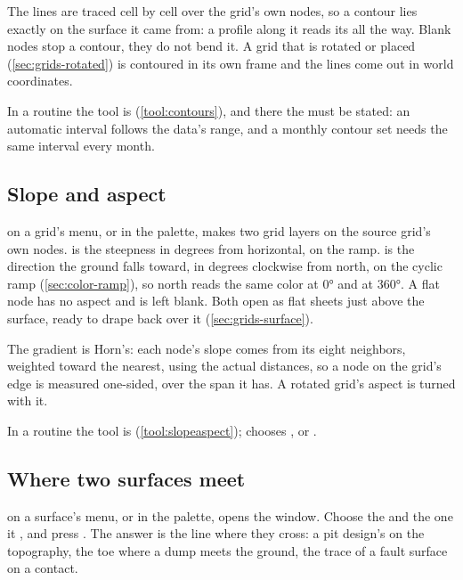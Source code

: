 The lines are traced cell by cell over the grid's own nodes, so a contour lies exactly on the surface it came from: a profile along it reads its  all the way. Blank nodes stop a contour, they do not bend it. A grid that is rotated or placed (\cref{sec:grids-rotated}) is contoured in its own frame and the lines come out in world coordinates.

In a routine the tool is  (\cref{tool:contours}), and there the  must be stated: an automatic interval follows the data's range, and a monthly contour set needs the same interval every month.

\subsection{Slope and aspect}\label{sec:grids-slope}
 on a grid's menu, or  in the palette, makes two grid layers on the source grid's own nodes.  is the steepness in degrees from horizontal, on the  ramp.  is the direction the ground falls toward, in degrees clockwise from north, on the cyclic  ramp (\cref{sec:color-ramp}), so north reads the same color at 0° and at 360°. A flat node has no aspect and is left blank. Both open as flat sheets just above the surface, ready to drape back over it (\cref{sec:grids-surface}).

The gradient is Horn's: each node's slope comes from its eight neighbors, weighted toward the nearest, using the actual distances, so a node on the grid's edge is measured one-sided, over the span it has. A rotated grid's aspect is turned with it.

In a routine the tool is  (\cref{tool:slopeaspect});  chooses ,  or .

\subsection{Where two surfaces meet}\label{sec:grids-intersection}
 on a surface's menu, or  in the palette, opens the  window. Choose the  and the one it , and press . The answer is the line where they cross: a pit design's  on the topography, the toe where a dump meets the ground, the trace of a fault surface on a contact.

